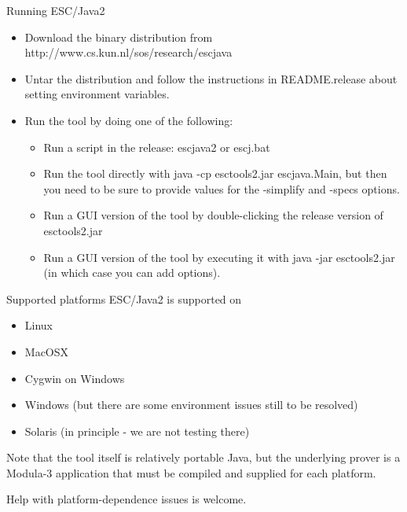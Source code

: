 \documentclass[
pdf,
nocolorBG,
slideColor,
cok,
]{prosper}
\begin{document}
\begin{slide}{Running ESC/Java2}
\vspace*{-6ex}
\begin{itemize}
\item Download the binary distribution from {\green http://www.cs.kun.nl/sos/research/escjava}
\item Untar the distribution and follow the instructions in {\green README.release} about setting environment variables.
\item Run the tool by doing one of the following:
\begin{itemize}
\item Run a script in the release: {\green escjava2} or {\green escj.bat}
\item Run the tool directly with {\green java -cp esctools2.jar escjava.Main}, but then you need to be sure to provide values for the {\blue -simplify} and {\blue -specs}  options.
\item Run a GUI version of the tool by double-clicking the release version of {\green esctools2.jar}
\item Run a GUI version of the tool by executing it with {\green java -jar esctools2.jar} (in which case you can add options).
\end{itemize}
\end{itemize}
\end{slide}


\begin{slide}{Supported platforms}
\vspace*{-6ex}
ESC/Java2 is supported on
\begin{itemize}
\item Linux
\item MacOSX
\item Cygwin on Windows
\item Windows (but there are some environment issues still to be resolved)
\item Solaris (in principle - we are not testing there)
\end{itemize}
Note that the tool itself is relatively portable Java, but the underlying prover is a Modula-3 application that must be compiled and supplied for each platform.

Help with platform-dependence issues is welcome.
\end{slide}

\end{document}

